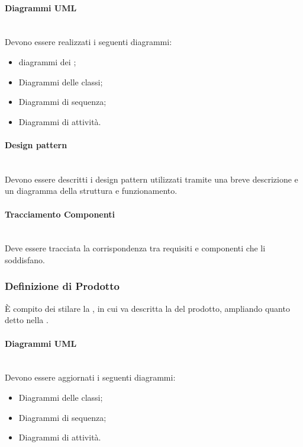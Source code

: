 \paragraph{Diagrammi UML}\mbox{}\\
Devono essere realizzati i seguenti diagrammi:
\begin{itemize}
\item diagrammi dei ;
\item Diagrammi delle classi;
\item Diagrammi di sequenza;
\item Diagrammi di attività.
\end{itemize}

\paragraph{Design pattern}\mbox{}\\
Devono essere descritti i design pattern utilizzati tramite una breve descrizione e un diagramma della struttura e funzionamento.

\paragraph{Tracciamento Componenti}\mbox{}\\
Deve essere tracciata la corrispondenza tra requisiti e componenti che li soddisfano.

\subsubsection{Definizione di Prodotto}
È compito dei \Progettisti\space stilare la \DefinizioneDiProdotto, in cui va descritta la \PD{} del prodotto, ampliando quanto detto nella \SpecificaTecnica.

\paragraph{Diagrammi UML}\mbox{}\\
Devono essere aggiornati i seguenti diagrammi:
\begin{itemize}
\item Diagrammi delle classi;
\item Diagrammi di sequenza;
\item Diagrammi di attività.
\end{itemize}

